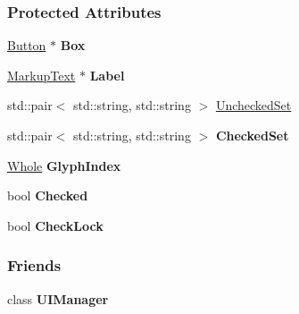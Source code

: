 \subsubsection*{Protected Attributes}
\begin{DoxyCompactItemize}
\item 
\hypertarget{classphys_1_1UI_1_1CheckBox_a1118ba10131845d77085bc1b9e41fdab}{
\hyperlink{classphys_1_1UI_1_1Button}{Button} $\ast$ {\bfseries Box}}
\label{classphys_1_1UI_1_1CheckBox_a1118ba10131845d77085bc1b9e41fdab}

\item 
\hypertarget{classphys_1_1UI_1_1CheckBox_a99640351f23baac8e36ef3d64140e404}{
\hyperlink{classphys_1_1UI_1_1MarkupText}{MarkupText} $\ast$ {\bfseries Label}}
\label{classphys_1_1UI_1_1CheckBox_a99640351f23baac8e36ef3d64140e404}

\item 
std::pair$<$ std::string, std::string $>$ \hyperlink{classphys_1_1UI_1_1CheckBox_a7b670d93f119193283ec78b94f842429}{UncheckedSet}
\item 
\hypertarget{classphys_1_1UI_1_1CheckBox_ae4bb7dad2474b7f74ebe1320fef7a58e}{
std::pair$<$ std::string, std::string $>$ {\bfseries CheckedSet}}
\label{classphys_1_1UI_1_1CheckBox_ae4bb7dad2474b7f74ebe1320fef7a58e}

\item 
\hypertarget{classphys_1_1UI_1_1CheckBox_afc37b1eaaf6ab441a71569757802571b}{
\hyperlink{namespacephys_a460f6bc24c8dd347b05e0366ae34f34a}{Whole} {\bfseries GlyphIndex}}
\label{classphys_1_1UI_1_1CheckBox_afc37b1eaaf6ab441a71569757802571b}

\item 
\hypertarget{classphys_1_1UI_1_1CheckBox_af539bce89119b8e21fa19f170cc5d7e5}{
bool {\bfseries Checked}}
\label{classphys_1_1UI_1_1CheckBox_af539bce89119b8e21fa19f170cc5d7e5}

\item 
\hypertarget{classphys_1_1UI_1_1CheckBox_ae8f71565ce43129a44930131850d6e16}{
bool {\bfseries CheckLock}}
\label{classphys_1_1UI_1_1CheckBox_ae8f71565ce43129a44930131850d6e16}

\end{DoxyCompactItemize}
\subsubsection*{Friends}
\begin{DoxyCompactItemize}
\item 
\hypertarget{classphys_1_1UI_1_1CheckBox_ab811b36cd63b54fe42b6acb231ea21bc}{
class {\bfseries UIManager}}
\label{classphys_1_1UI_1_1CheckBox_ab811b36cd63b54fe42b6acb231ea21bc}

\end{DoxyCompactItemize}


